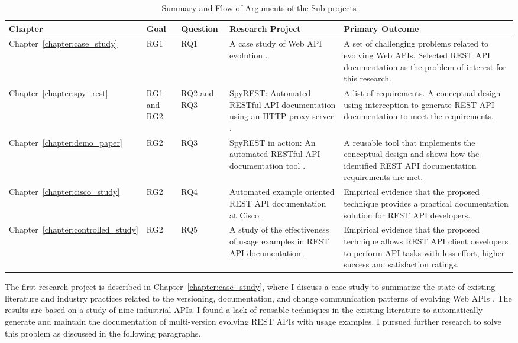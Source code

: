 \begin{table}
  \caption{Summary and Flow of Arguments of the Sub-projects}
  \begin{tabular}{|p{1.5cm}|p{1.5cm}|p{1.5cm}|p{4.5cm}|p{6cm}|}
  \hline
  Chapter & Goal & Question& Research Project & Primary Outcome \\
  \hline
  Chapter~\ref{chapter:case_study}  & RG1 & RQ1 & A case study of Web API evolution \cite{sohan2015case}. & A set of challenging problems related to evolving Web APIs. Selected REST API documentation as the problem of interest for this research. \\
  \hline
  Chapter~\ref{chapter:spy_rest} & RG1 and RG2 & RQ2 and RQ3 & SpyREST: Automated RESTful API documentation using an HTTP proxy server \cite{sohan2015spyrest}. & A list of requirements. A conceptual design using interception to generate REST API documentation to meet the requirements. \\
  \hline
  Chapter~\ref{chapter:demo_paper} & RG2 & RQ3 & SpyREST in action: An automated RESTful API documentation tool \cite{sohan2015spyrest_tool}. & A reusable tool that implements the conceptual design and shows how the identified REST API documentation requirements are met.\\
  \hline
  Chapter~\ref{chapter:cisco_study} & RG2 & RQ4 & Automated example oriented REST API documentation at Cisco \cite{sohan_cisco}. & Empirical evidence that the proposed technique provides a practical documentation solution for REST API developers.\\
  \hline
  Chapter~\ref{chapter:controlled_study} & RG2 & RQ5 & A study of the effectiveness of usage examples in REST API documentation \cite{sohan_vlhcc}. & Empirical evidence that the proposed technique allows REST API client developers to perform API tasks with less effort, higher success and satisfaction ratings.\\
  \hline
\end{tabular}
\label{table:chapter_summary}
\end{table}

The first research project is described in Chapter~\ref{chapter:case_study}, where I discuss a case study to summarize the state of existing literature and industry practices related to the versioning, documentation, and change communication patterns of evolving Web APIs \cite{sohan2015case}. The results are based on a study of nine industrial APIs. I found a lack of reusable techniques in the existing literature to automatically generate and maintain the documentation of multi-version evolving REST APIs with usage examples. I pursued further research to solve this problem as discussed in the following paragraphs.

